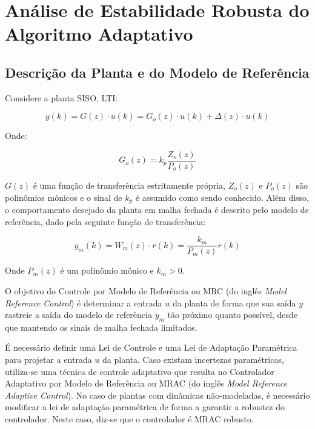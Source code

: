 
\chapter{Análise de Estabilidade Robusta do Algoritmo Adaptativo}\label{provas}

\section{Descrição da Planta e do Modelo de Referência}

    Considere a planta SISO, LTI:

    \begin{equation}
        y(k) = G(z) \cdot u(k) = G_o(z) \cdot u(k) + \Delta(z) \cdot u(k)
        \label{eq:saida_da_planta}
    \end{equation}

    Onde:

    \begin{equation}
        G_o(z) = k_p \frac{Z_o(z)}{P_o(z)}
    \end{equation}

    $G(z)$ é uma função de transferência estritamente própria, $Z_o(z)$ e $P_o(z)$
    são polinômios mônicos e o sinal de $k_p$ é assumido como sendo conhecido. Além
    disso, o comportamento desejado da planta em malha fechada é descrito pelo modelo de
    referência, dado pela seguinte função de transferência:

    \begin{equation}
        y_m(k) = W_m(z) \cdot r(k) = \frac{k_m}{P_m(z)} r(k)
        \label{eq:saida_do_modelo_de_referencia}
    \end{equation}

    Onde $P_m(z)$ é um polinômio mônico e $k_m > 0$.

    O objetivo do Controle por Modelo de Referência ou MRC (do inglês \emph{Model
    Reference Control}) é determinar a entrada $u$ da planta de forma que sua saída
    $y$ rastreie a saída do modelo de referência $y_m$ tão próximo quanto possível,
    desde que mantendo os sinais de malha fechada limitados.

    É necessário definir uma Lei de Controle e uma Lei de Adaptação Paramétrica para
    projetar a entrada $u$ da planta. Caso existam incertezas paramétricas, utiliza-se
    uma técnica de controle adaptativo que resulta no Controlador Adaptativo por Modelo
    de Referência ou MRAC (do inglês \emph{Model Reference Adaptive Control}).
    No caso de plantas com dinâmicas não-modeladas, é
    necessário modificar a lei de adaptação paramétrica de forma a garantir a robustez
    do controlador. Neste caso, diz-se que o controlador é MRAC robusto.

